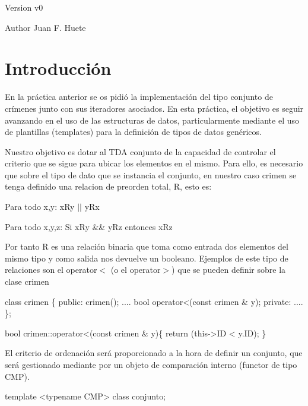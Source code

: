 \begin{DoxyVersion}{Version}
v0 
\end{DoxyVersion}
\begin{DoxyAuthor}{Author}
Juan F. Huete
\end{DoxyAuthor}
\hypertarget{index_intro_sec}{}\section{Introducción}\label{index_intro_sec}
En la práctica anterior se os pidió la implementación del tipo conjunto de crímenes junto con sus iteradores asociados. En esta práctica, el objetivo es seguir avanzando en el uso de las estructuras de datos, particularmente mediante el uso de plantillas (templates) para la definición de tipos de datos genéricos.

Nuestro objetivo es dotar al T\-D\-A conjunto de la capacidad de controlar el criterio que se sigue para ubicar los elementos en el mismo. Para ello, es necesario que sobre el tipo de dato que se instancia el conjunto, en nuestro caso crimen se tenga definido una relacion de preorden total, R, esto es\-:

\begin{DoxyItemize}
\item Para todo x,y\-: x\-Ry $\vert$$\vert$ y\-Rx \item Para todo x,y,z\-: Si x\-Ry \&\& y\-Rz entonces x\-Rz\end{DoxyItemize}
Por tanto R es una relación binaria que toma como entrada dos elementos del mismo tipo y como salida nos devuelve un booleano. Ejemplos de este tipo de relaciones son el operator$<$ (o el operator$>$) que se pueden definir sobre la clase crimen 
\begin{DoxyCode}
\textcolor{keyword}{class }crimen \{
 \textcolor{keyword}{public}:
  crimen();
  ....
  \textcolor{keywordtype}{bool} operator<(\textcolor{keyword}{const} crimen & y);
 \textcolor{keyword}{private}:
  ....
\};

\textcolor{keywordtype}{bool} crimen::operator<(\textcolor{keyword}{const} crimen & y)\{
  \textcolor{keywordflow}{return} (this->ID < y.ID);
\}
\end{DoxyCode}


El criterio de ordenación será proporcionado a la hora de definir un conjunto, que será gestionado mediante por un objeto de comparación interno (functor de tipo C\-M\-P).


\begin{DoxyCode}
\textcolor{keyword}{template} <\textcolor{keyword}{typename} CMP> \textcolor{keyword}{class }conjunto;
\end{DoxyCode}



